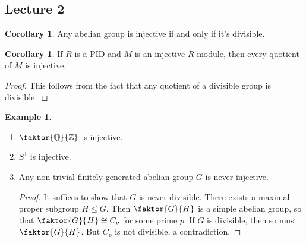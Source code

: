 \documentclass[10pt,letterpaper,cm]{nupset}
\theoremstyle{definition}
\newtheorem{exmp}[definition]{Example}
\theoremstyle{theorem}
\newtheorem{corollary}[definition]{Corollary}
\theoremstyle{remark}
\newcommand{\Q}{\mathbb Q}
\newcommand{\Z}{\mathbb Z}
\newcommand{\1}{\mathbf{1}}
\newcommand{\0}{\vec 0}
\begin{document}
\subsection{Lecture 2}

\begin{corollary}
Any abelian group is injective if and only if it's divisible. 
\end{corollary}

\begin{corollary}
If $R$ is a PID and $M$ is an injective $R$-module, then every quotient of $M$ is injective.
\end{corollary}
\begin{proof}
This follows from the fact that any quotient of a divisible group is divisible.
\end{proof}

\begin{exmp} $ $
\begin{enumerate}
\item $\faktor{\Q}{\Z}$ is injective.
\item $S^1$ is injective.
\item Any non-trivial finitely generated abelian group $G$ is never injective.
\begin{proof}
It suffices to show that $G$ is never divisible. There exists a maximal proper subgroup $H\leq G$. Then $\faktor{G}{H}$ is a simple abelian group, so that $\faktor{G}{H} \cong C_p$ for some prime $p$. If $G$ is divisible, then so must $\faktor{G}{H}$. But $C_p$ is not divisible, a contradiction. 
\end{proof}
\end{enumerate}
\end{exmp}
\end{document}
